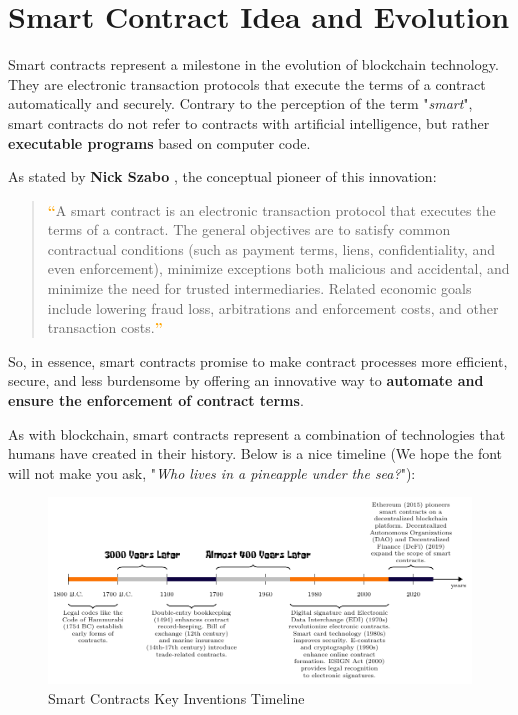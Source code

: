 \section{Smart Contract Idea and Evolution}

Smart contracts represent a milestone in the evolution of blockchain technology. They are electronic transaction protocols that execute the terms of a contract automatically and securely. Contrary to the perception of the term "\textit{smart}", smart contracts do not refer to contracts with artificial intelligence, but rather \textbf{executable programs} based on computer code.

As stated by \textbf{Nick Szabo} \cite{Szabo_1997}, the conceptual pioneer of this innovation:
\begin{quote}
{\Large\textbf{\textcolor{Orange}{“}}}A smart contract is an electronic transaction protocol that executes the terms of a contract. The general objectives are to satisfy common contractual conditions (such as payment terms, liens, confidentiality, and even enforcement), minimize exceptions both malicious and accidental, and minimize the need for trusted intermediaries. Related economic goals include lowering fraud loss, arbitrations and enforcement costs, and other transaction costs.{\Large\textbf{\textcolor{Orange}{”}}} 
\end{quote}
So, in essence, smart contracts promise to make contract processes more efficient, secure, and less burdensome by offering an innovative way to \textbf{automate and ensure the enforcement of contract terms}.

As with blockchain, smart contracts represent a combination of technologies that humans have created in their history. Below is a nice timeline (We hope the font will not make you ask, "\textit{Who lives in a pineapple under the sea?}"):

\vspace{-0.5cm}
\begin{figure}[!htbp]
\centering
\includegraphics[width=\linewidth]{tikz/chapter4 - Smart Contract Timeline.pdf}
\caption{Smart Contracts Key Inventions Timeline}
\end{figure}


